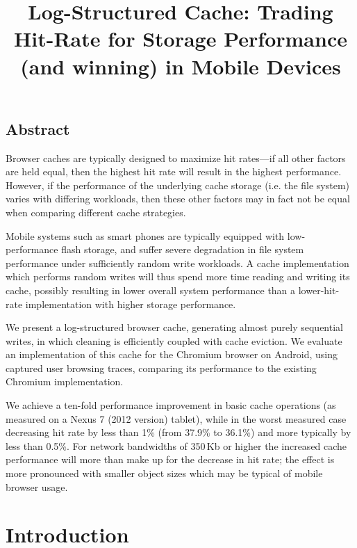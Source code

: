\documentclass[letterpaper,twocolumn,10pt]{article}
\begin{document}
\title{\Large \bf Log-Structured Cache: Trading Hit-Rate for Storage Performance
  (and winning) in Mobile Devices}

\date{}
\maketitle

\thispagestyle{empty}

\subsection*{Abstract}
Browser caches are typically designed to maximize hit rates---if all other
factors are held equal, then the highest hit rate will result in the highest
performance. However, if the performance of the underlying cache storage
(i.e. the file system) varies with differing workloads, then these other factors
may in fact not be equal when comparing different cache strategies.

Mobile systems such as smart phones are typically equipped with low-performance flash
storage, and suffer severe degradation in file system performance under
sufficiently random write workloads. A cache implementation which performs
random writes will thus spend more time reading and writing its cache, possibly
resulting in lower overall system performance than a lower-hit-rate
implementation with higher storage performance.

We present a log-structured browser cache, generating almost purely sequential
writes, in which cleaning is efficiently coupled with cache
eviction. We evaluate an
implementation of this cache for the Chromium browser on Android, using
captured user browsing traces, comparing 
its performance to the existing Chromium implementation.

We achieve a ten-fold performance improvement in basic cache operations (as
measured on a Nexus 7 (2012 version) tablet), while in the worst measured case
decreasing hit rate by less than 1\% (from 37.9\% to 36.1\%) and more
typically by less than 0.5\%. For network
bandwidths of 350\,Kb or higher the increased cache performance will
more than make up for the decrease in hit rate; the effect is more
pronounced with smaller object sizes which may be typical of mobile
browser usage.

\section{Introduction}
\end{document}
